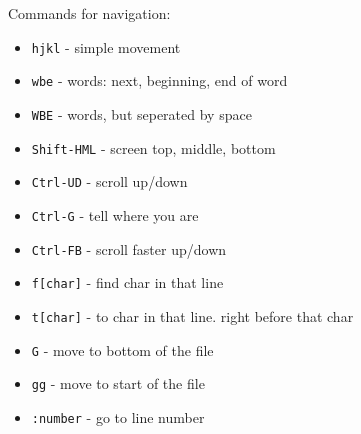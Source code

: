 Commands for navigation:
\begin{itemize}
	\setlength\itemsep{0em}
	\item \verb|hjkl| - simple movement
	\item \verb|wbe| - words: next, beginning, end of word
	\item \verb|WBE| - words, but seperated by space
	\item \verb|Shift-HML| - screen top, middle, bottom
	\item \verb|Ctrl-UD| - scroll up/down
	\item \verb|Ctrl-G| - tell where you are
	\item \verb|Ctrl-FB| - scroll faster up/down
	\item \verb|f[char]| - find char in that line
	\item \verb|t[char]| - to char in that line. right before that char
	\item \verb|G| - move to bottom of the file
	\item \verb|gg| - move to start of the file
	\item \verb|:number| - go to line number	
\end{itemize}

